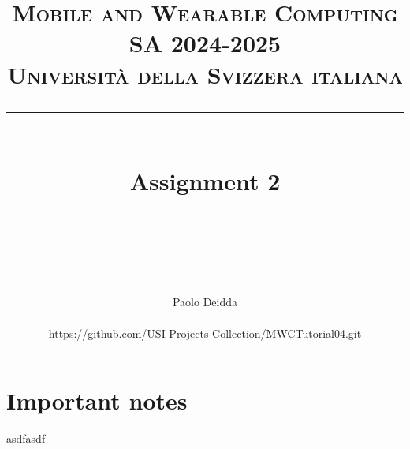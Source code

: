 \documentclass{article}
\title{
	\normalfont\normalsize
	\textsc{Mobile and Wearable Computing SA 2024-2025\\%
	Universit\`a della Svizzera italiana}\\
	\vspace{25pt}
	\rule{\linewidth}{0.5pt}\\
	\vspace{20pt}
	{\huge Assignment 2}\\
	\vspace{12pt}
	\rule{\linewidth}{1pt}\\
	\vspace{12pt}
}
\author{
  Paolo Deidda \\
  \text{paolo.deidda@usi.ch} \\ 
  \url{https://github.com/USI-Projects-Collection/MWCTutorial04.git}
}
\begin{document}
\maketitle

\tableofcontents

\section*{Important notes}
asdfasdf

\newpage


\newpage


\newpage

\end{document}
